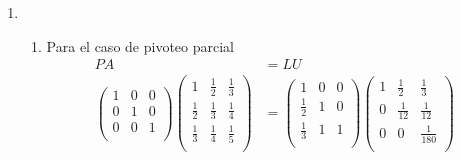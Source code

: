 \begin{enumerate}[]
\begin{enumerate}[]
        \item
        \begin{enumerate}[]
            \item Para el caso de pivoteo parcial
            \begin{align*}
                PA &= LU\\
                \begin{pmatrix}
                1 & 0 & 0 \\ 
                0 & 1 & 0 \\
                0 & 0 & 1 \\
                \end{pmatrix}
                \begin{pmatrix}
                1 & \frac{1}{2} & \frac{1}{3} \\ 
                \frac{1}{2} & \frac{1}{3} & \frac{1}{4} \\
                \frac{1}{3} & \frac{1}{4} & \frac{1}{5} \\
                \end{pmatrix} &= 
                \begin{pmatrix}
                1 & 0 & 0 \\ 
                \frac{1}{2} & 1 & 0 \\
                \frac{1}{3} & 1 & 1 \\
                \end{pmatrix}
                \begin{pmatrix}
                1 & \frac{1}{2} & \frac{1}{3} \\ 
                0 & \frac{1}{12} & \frac{1}{12} \\
                0 & 0 & \frac{1}{180} \\
                \end{pmatrix}
            \end{align*}
            \\
            

\end{enumerate}
\end{enumerate}
\end{enumerate}
